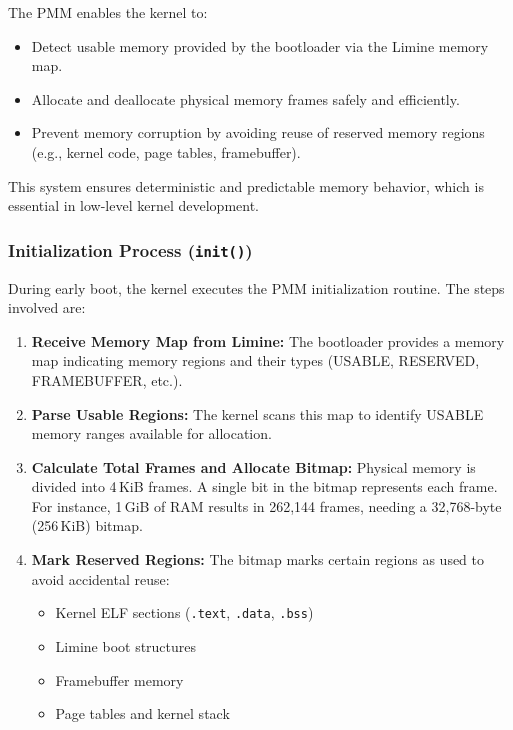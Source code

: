 \documentclass[12pt]{extarticle}
\begin{document}
The PMM enables the kernel to:
\begin{itemize}
  \item Detect usable memory provided by the bootloader via the Limine memory map.
  \item Allocate and deallocate physical memory frames safely and efficiently.
  \item Prevent memory corruption by avoiding reuse of reserved memory regions (e.g., kernel code, page tables, framebuffer).
\end{itemize}

This system ensures deterministic and predictable memory behavior, which is essential in low-level kernel development.

\subsubsection*{Initialization Process (\texttt{init()})}

During early boot, the kernel executes the PMM initialization routine. The steps involved are:

\begin{enumerate}
  \item \textbf{Receive Memory Map from Limine:} The bootloader provides a memory map indicating memory regions and their types (USABLE, RESERVED, FRAMEBUFFER, etc.).
  
  \item \textbf{Parse Usable Regions:} The kernel scans this map to identify USABLE memory ranges available for allocation.
  
  \item \textbf{Calculate Total Frames and Allocate Bitmap:} Physical memory is divided into 4\,KiB frames. A single bit in the bitmap represents each frame. For instance, 1\,GiB of RAM results in 262,144 frames, needing a 32,768-byte (256\,KiB) bitmap.
  
  \item \textbf{Mark Reserved Regions:} The bitmap marks certain regions as used to avoid accidental reuse:
    \begin{itemize}
      \item Kernel ELF sections (\texttt{.text}, \texttt{.data}, \texttt{.bss})
      \item Limine boot structures
      \item Framebuffer memory
      \item Page tables and kernel stack
    \end{itemize}
\end{enumerate}
\end{document}
